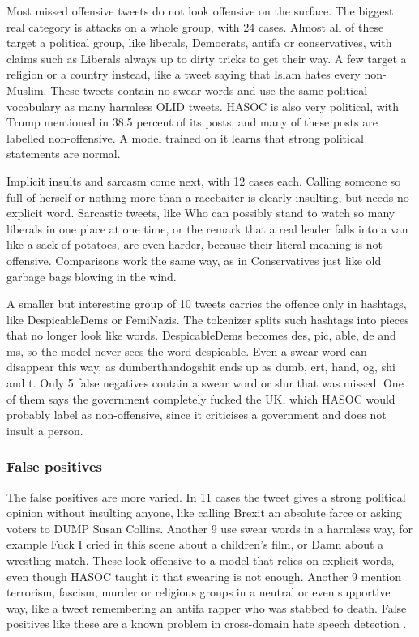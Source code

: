 \documentclass[11pt,a4paper]{article}
\begin{document}
Most missed offensive tweets do not look offensive on the surface. The biggest real category is attacks on a whole group, with 24 cases. Almost all of these target a political group, like liberals, Democrats, antifa or conservatives, with claims such as Liberals always up to dirty tricks to get their way. A few target a religion or a country instead, like a tweet saying that Islam hates every non-Muslim. These tweets contain no swear words and use the same political vocabulary as many harmless OLID tweets. HASOC is also very political, with Trump mentioned in 38.5 percent of its posts, and many of these posts are labelled non-offensive. A model trained on it learns that strong political statements are normal.

Implicit insults and sarcasm come next, with 12 cases each. Calling someone so full of herself or nothing more than a racebaiter is clearly insulting, but needs no explicit word. Sarcastic tweets, like Who can possibly stand to watch so many liberals in one place at one time, or the remark that a real leader falls into a van like a sack of potatoes, are even harder, because their literal meaning is not offensive. Comparisons work the same way, as in Conservatives just like old garbage bags blowing in the wind.

A smaller but interesting group of 10 tweets carries the offence only in hashtags, like DespicableDems or FemiNazis. The tokenizer splits such hashtags into pieces that no longer look like words. DespicableDems becomes des, pic, able, de and ms, so the model never sees the word despicable. Even a swear word can disappear this way, as dumberthandogshit ends up as dumb, ert, hand, og, shi and t. Only 5 false negatives contain a swear word or slur that was missed. One of them says the government completely fucked the UK, which HASOC would probably label as non-offensive, since it criticises a government and does not insult a person.

\subsubsection{False positives}

The false positives are more varied. In 11 cases the tweet gives a strong political opinion without insulting anyone, like calling Brexit an absolute farce or asking voters to DUMP Susan Collins. Another 9 use swear words in a harmless way, for example Fuck I cried in this scene about a children's film, or Damn about a wrestling match. These look offensive to a model that relies on explicit words, even though HASOC taught it that swearing is not enough. Another 9 mention terrorism, fascism, murder or religious groups in a neutral or even supportive way, like a tweet remembering an antifa rapper who was stabbed to death. False positives like these are a known problem in cross-domain hate speech detection \citep{markov2021improving}.
\end{document}
